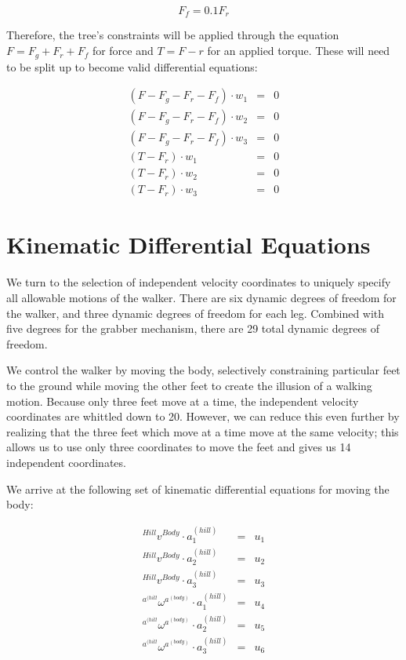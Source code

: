 \documentclass{article}
\begin{document}
\begin{equation*}
F_f = 0.1F_r
\end{equation*}

Therefore, the tree's constraints will be applied through the equation $F = F_g + F_r + F_f$ for force and $T = F-r$ for an applied torque. These will need to be split up to become valid differential equations:

\begin{eqnarray*}
\left(F - F_g - F_r - F_f\right) \cdot w_1 & = & 0 \\
\left(F - F_g - F_r - F_f\right) \cdot w_2 & = & 0 \\
\left(F - F_g - F_r - F_f\right) \cdot w_3 & = & 0 \\
\left(T - F_r\right) \cdot w_1 & = & 0 \\
\left(T - F_r\right) \cdot w_2 & = & 0 \\
\left(T - F_r\right) \cdot w_3 & = & 0
\end{eqnarray*}%

\section{Kinematic Differential Equations} %
We turn to the selection of independent velocity coordinates to uniquely specify all allowable motions of the walker. There are six dynamic degrees of freedom for the walker, and three dynamic degrees of freedom for each leg. Combined with five degrees for the grabber mechanism, there are 29 total dynamic degrees of freedom.

We control the walker by moving the body, selectively constraining particular feet to the ground while moving the other feet to create the illusion of a walking motion. Because only three feet move at a time, the independent velocity coordinates are whittled down to 20. However, we can reduce this even further by realizing that the three feet which move at a time move at the same velocity; this allows us to use only three coordinates to move the feet and gives us 14 independent coordinates.

We arrive at the following set of kinematic differential equations for moving the body:

\begin{eqnarray*}
{}^{Hill}v^{Body} \cdot a_1^{(hill)} & = & u_1 \\
{}^{Hill}v^{Body} \cdot a_2^{(hill)} & = & u_2 \\
{}^{Hill}v^{Body} \cdot a_3^{(hill)} & = & u_3 \\
{}^{a^{(hill}}\omega^{a^{(body)}} \cdot a_1^{(hill)} & = & u_4 \\
{}^{a^{(hill}}\omega^{a^{(body)}} \cdot a_2^{(hill)} & = & u_5 \\
{}^{a^{(hill}}\omega^{a^{(body)}} \cdot a_3^{(hill)} & = & u_6
\end{eqnarray*}
\end{document}
